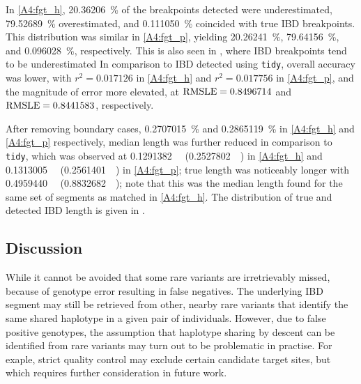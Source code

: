 In \cref{A4:fgt_h}, \SI{20.36206}{\percent} of the breakpoints detected were underestimated, \SI{79.52689}{\percent} overestimated, and \SI{0.111050}{\percent} coincided with true IBD breakpoints.
This distribution was similar in \cref{A4:fgt_p}, yielding \SI{20.26241}{\percent}, \SI{79.64156}{\percent}, and \SI{0.096028}{\percent}, respectively.
This is also seen in , where IBD breakpoints tend to be underestimated
In comparison to IBD detected using \texttt{tidy}, overall accuracy was lower, with ${r^2=0.017126}$ in \ref{A4:fgt_h} and ${r^2=0.017756}$ in \ref{A4:fgt_p}, and the magnitude of error more elevated, at ${\operatorname*{RMSLE}=0.8496714}$ and ${\operatorname*{RMSLE}=0.8441583}$, respectively.

%

%

After removing boundary cases,
\SI{0.2707015}{\percent} and \SI{0.2865119}{\percent} in \ref{A4:fgt_h} and \ref{A4:fgt_p} respectively, median length was further reduced in comparison to \texttt{tidy}, which was observed at \SI{0.1291382}{\mega\basepair} (\SI{0.2527802}{\centi\morgan}) in \ref{A4:fgt_h} and
\SI{0.1313005}{\mega\basepair} (\SI{0.2561401}{\centi\morgan}) in \ref{A4:fgt_p};
true length was noticeably longer with \SI{0.4959440}{\mega\basepair} (\SI{0.8832682}{\centi\morgan}); note that this was the median length found for the same set of segments as matched in \ref{A4:fgt_h}.
The distribution of true and detected IBD length is given in .



%
\subsection{Discussion}
%


While it cannot be avoided that some rare variants are irretrievably missed, because of genotype error resulting in false negatives.
The underlying IBD segment may still be retrieved from other, nearby rare variants that identify the same shared haplotype in a given pair of individuals.
However, due to false positive genotypes, the assumption that haplotype sharing by descent can be identified from rare variants may turn out to be problematic in practise.
For exaple, strict quality control may exclude certain candidate target sites, but which requires further consideration in future work.

